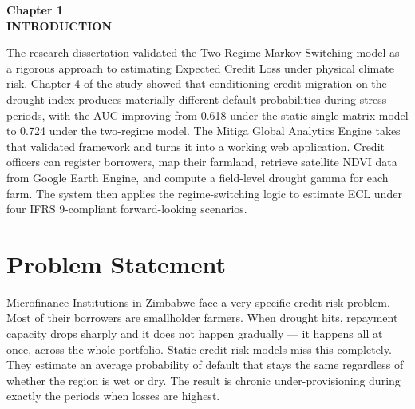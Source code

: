 \documentclass[12pt,a4paper]{article}
\begin{document}
\newpage

\hypersetup{pageanchor=false}
\setcounter{page}{1}
\hypersetup{pageanchor=true}

\begin{center}
    {\large\bfseries Chapter 1}\\[0.5cm]
    {\LARGE\bfseries INTRODUCTION}
\end{center}
{}

\vspace{0.8cm}

The research dissertation validated the Two-Regime Markov-Switching model as a rigorous approach to estimating Expected Credit Loss under physical climate risk. Chapter 4 of the study showed that conditioning credit migration on the drought index produces materially different default probabilities during stress periods, with the AUC improving from 0.618 under the static single-matrix model to 0.724 under the two-regime model. The Mitiga Global Analytics Engine takes that validated framework and turns it into a working web application. Credit officers can register borrowers, map their farmland, retrieve satellite NDVI data from Google Earth Engine, and compute a field-level drought gamma for each farm. The system then applies the regime-switching logic to estimate ECL under four IFRS 9-compliant forward-looking scenarios.

\setcounter{section}{0}
\renewcommand{\thesection}{1.\arabic{section}}

\section{Problem Statement}

Microfinance Institutions in Zimbabwe face a very specific credit risk problem. Most of their borrowers are smallholder farmers. When drought hits, repayment capacity drops sharply and it does not happen gradually --- it happens all at once, across the whole portfolio. Static credit risk models miss this completely. They estimate an average probability of default that stays the same regardless of whether the region is wet or dry. The result is chronic under-provisioning during exactly the periods when losses are highest.
\end{document}
